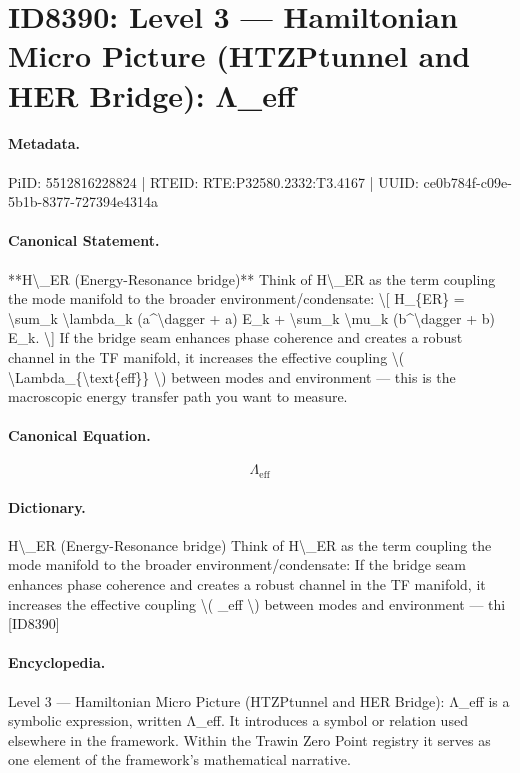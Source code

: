 \section*{ID8390: Level 3 — Hamiltonian Micro Picture (HTZPtunnel and HER Bridge): Λ\_eff}
\paragraph{Metadata.}
PiID: 5512816228824 | RTEID: RTE:P32580.2332:T3.4167 | UUID: ce0b784f-c09e-5b1b-8377-727394e4314a

\paragraph{Canonical Statement.}
**H\textbackslash{}\_ER (Energy-Resonance bridge)** Think of H\textbackslash{}\_ER as the term coupling the mode manifold to the broader environment/condensate: \textbackslash{}[ H\_\{ER\} = \textbackslash{}sum\_k \textbackslash{}lambda\_k (a\textasciicircum{}\textbackslash{}dagger + a) E\_k + \textbackslash{}sum\_k \textbackslash{}mu\_k (b\textasciicircum{}\textbackslash{}dagger + b) E\_k. \textbackslash{}] If the bridge seam enhances phase coherence and creates a robust channel in the TF manifold, it increases the effective coupling \textbackslash{}( \textbackslash{}Lambda\_\{\textbackslash{}text\{eff\}\} \textbackslash{}) between modes and environment — this is the macroscopic energy transfer path you want to measure.

\paragraph{Canonical Equation.}
\[
\Lambda_{\text{eff}}
\]

\paragraph{Dictionary.}
H\textbackslash{}\_ER (Energy-Resonance bridge) Think of H\textbackslash{}\_ER as the term coupling the mode manifold to the broader environment/condensate: If the bridge seam enhances phase coherence and creates a robust channel in the TF manifold, it increases the effective coupling \textbackslash{}( \_eff \textbackslash{}) between modes and environment — thi [ID8390]

\paragraph{Encyclopedia.}
Level 3 — Hamiltonian Micro Picture (HTZPtunnel and HER Bridge): Λ\_eff is a symbolic expression, written Λ\_eff. It introduces a symbol or relation used elsewhere in the framework. Within the Trawin Zero Point registry it serves as one element of the framework's mathematical narrative.
